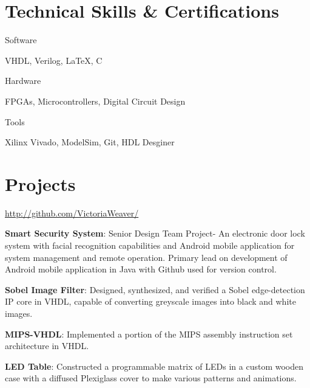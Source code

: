 \documentclass[a4paper,margin,line]{resume}
\begin{document}
\begin{resume}
\section{\mysidestyle Technical Skills \& Certifications}
    \begin{compactdesc}
        \item[Software] \begin{inparaenum} { \small
            VHDL,
            Verilog,
            \LaTeX,
            C
        } \end{inparaenum}
        \item[Hardware] \begin{inparaenum} { \small
            FPGAs, 
            Microcontrollers, 
            Digital Circuit Design
       } \end{inparaenum}
        \item[Tools] \begin{inparaenum} { \small
            Xilinx Vivado,
            ModelSim,
            Git,
            HDL Desginer
        } \end{inparaenum}
    \end{compactdesc}

\section{\mysidestyle Projects}
    \begin{asparablank}
        \item \href{http://github.com/VictoriaWeaver/}{http://github.com/VictoriaWeaver/}\smallskip
        \item \textbf{Smart Security System}: Senior Design Team Project- An electronic door lock system with facial recognition capabilities and Android mobile application for system management and remote operation. Primary lead on development of Android mobile application in Java with Github used for version control.\smallskip
        \item \textbf{Sobel Image Filter}: Designed, synthesized, and verified a Sobel edge-detection IP core in VHDL, capable of converting greyscale images into black and white images.\smallskip
        \item \textbf{MIPS-VHDL}: Implemented a portion of the MIPS assembly instruction set architecture in VHDL.\smallskip
        \item \textbf{LED Table}: Constructed a programmable matrix of LEDs in a custom wooden case with a diffused Plexiglass cover to make various patterns and animations.
    \end{asparablank}
    
\end{resume}
\end{document}
